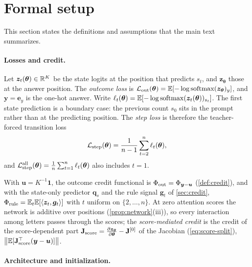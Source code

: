 \providecommand{\reg}[1]{\ensuremath{\mathsf{#1}}}

\section{Formal setup}
\label{app:formal}

This section states the definitions and assumptions that the main text summarizes.

\paragraph{Losses and credit.}

\begin{definition}
\label{def:losses}
Let $\bm z_t(\bm\theta)\in\mathbb R^K$ be the state logits at the position that predicts $s_t$, and $\bm z_{\bm\theta}$
those at the answer position. The \emph{outcome loss} is $\mathcal L_{\mathrm{out}}(\bm\theta)=\mathbb E[-\log\operatorname{softmax}(\bm z_{\bm\theta})_y]$, and $\bm y=\bm e_y$ is the one-hot answer.
Write $\ell_t(\bm\theta)=\mathbb E[-\log\operatorname{softmax}(\bm z_t(\bm\theta))_{s_t}]$. The first state prediction is a boundary case: the previous
count $s_0$ sits in the prompt rather than at the predicting position. The \emph{step loss} is therefore the teacher-forced
transition loss
\[
 \mathcal L_{\mathrm{step}}(\bm\theta)=\frac{1}{n-1}\sum_{t=2}^n\ell_t(\bm\theta),
\]
and $\Lstep^{\mathrm{all}}(\bm\theta)=\tfrac{1}{n}\sum_{t=1}^n\ell_t(\bm\theta)$ also includes $t=1$.
\end{definition}

With $\bm u=K^{-1}\bm 1$, the outcome credit functional is $\Phi_{\mathrm{out}}=\Phi_{\bm y-\bm u}$ (\cref{def:credit}), and with the state-only
predictor $\bm q_s$ and the rule signal $\bm g_t$ of \cref{sec:credit}, $\Phi_{\mathrm{rule}}=\mathbb E_t\mathbb E[\langle\bm z_t,\bm g_t\rangle]$ with $t$ uniform on $\{2,\ldots,n\}$. At zero
attention scores the network is additive over positions (\cref{prop:network}(iii)), so every interaction among letters passes through the
scores; the \emph{score-mediated credit} is the credit of the score-dependent part $\mathbf J_{\mathrm{score}}=\Jz-\mathbf J^{[0]}$ of the Jacobian (\cref{eq:score-split}),
$\bigl\|\mathbb E[\mathbf J_{\mathrm{score}}^\top(\bm y-\bm u)]\bigr\|$.

\paragraph{Architecture and initialization.}

